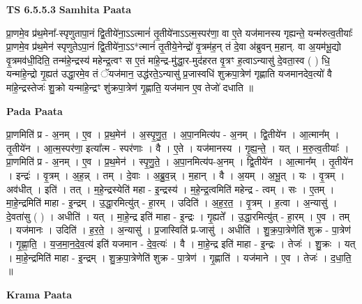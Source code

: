 \documentclass[17pt]{extarticle}
\begin{document}
\textbf{TS 6.5.5.3 } \newline
\textbf{Samhita Paata} \newline

प्रा॒णमे॒व प्र॑थ॒मेना᳚-स्पृणुतापा॒नं द्वि॒तीये॑ना॒ऽऽत्मानं॑ तृ॒तीये॑नाऽऽत्म॒स्पर॑णा॒ वा ए॒ते यज॑मानस्य गृह्यन्ते॒ यन्म॑रुत्व॒तीयाः᳚ प्रा॒णमे॒व प्र॑थ॒मेन॑ स्पृणुतेऽपा॒नं द्वि॒तीये॑ना॒ऽऽ*त्मानं॑ तृ॒तीये॒नेन्द्रो॑ वृ॒त्रम॑ह॒न् तं दे॒वा अ॑ब्रुवन् म॒हान्. वा अ॒यम॑भू॒द्यो वृ॒त्रमव॑धी॒दिति॒ तन्म॑हे॒न्द्रस्य॑ महेन्द्र॒त्वꣳ स ए॒तं मा॑हे॒न्द्र-मु॑द्धा॒र-मुद॑हरत वृ॒त्रꣳ ह॒त्वाऽन्यासु॑ दे॒वता॒स्व ( ) धि॒ यन्मा॑हे॒न्द्रो गृ॒ह्यत॑ उद्धा॒रमे॒व तं ॅयज॑मान॒ उद्ध॑रते॒ऽन्यासु॑ प्र॒जास्वधि॑ शुक्रपा॒त्रेण॑ गृह्णाति यजमानदेव॒त्यो॑ वै मा॑हे॒न्द्रस्तेजः॑ शु॒क्रो यन्मा॑हे॒न्द्रꣳ शु॑क्रपा॒त्रेण॑ गृ॒ह्णाति॒ यज॑मान ए॒व तेजो॑ दधाति ॥ \newline

\textbf{Pada Paata} \newline

प्रा॒णमिति॑ प्र - अ॒नम् । ए॒व । प्र॒थ॒मेन॑ । अ॒स्पृ॒णु॒त॒ । अ॒पा॒नमित्य॑प - अ॒नम् । द्वि॒तीये॑न । आ॒त्मान᳚म् । तृ॒तीये॑न । आ॒त्म॒स्पर॑णा॒ इत्या᳚त्म - स्पर॑णाः । वै । ए॒ते । यज॑मानस्य । गृ॒ह्य॒न्ते॒ । यत् । म॒रु॒त्व॒तीयाः᳚ । प्रा॒णमिति॑ प्र - अ॒नम् । ए॒व । प्र॒थ॒मेन॑ । स्पृ॒णु॒ते॒ । अ॒पा॒नमित्य॑प-अ॒नम् । द्वि॒तीये॑न । आ॒त्मान᳚म् । तृ॒तीये॑न । इन्द्रः॑ । वृ॒त्रम् । अ॒ह॒न्न् । तम् । दे॒वाः । अ॒ब्रु॒व॒न्न् । म॒हान् । वै । अ॒यम् । अ॒भू॒त् । यः । वृ॒त्रम् । अव॑धीत् । इति॑ । तत् । म॒हे॒न्द्रस्येति॑ महा - इ॒न्द्रस्य॑ । म॒हे॒न्द्र॒त्वमिति॑ महेन्द्र - त्वम् । सः । ए॒तम् । मा॒हे॒न्द्रमिति॑ माहा - इ॒न्द्रम् । उ॒द्धा॒रमित्यु॑त् - हा॒रम् । उदिति॑ । अ॒ह॒र॒त॒ । वृ॒त्रम् । ह॒त्वा । अ॒न्यासु॑ । दे॒वता॑सु ( ) । अधीति॑ । यत् । मा॒हे॒न्द्र इति॑ माहा - इ॒न्द्रः । गृ॒ह्यते᳚ । उ॒द्धा॒रमित्यु॑त् - हा॒रम् । ए॒व । तम् । यज॑मानः । उदिति॑ । ह॒र॒ते॒ । अ॒न्यासु॑ । प्र॒जास्विति॑ प्र-जासु॑ । अधीति॑ । शु॒क्र॒पा॒त्रेणेति॑ शुक्र - पा॒त्रेण॑ । गृ॒ह्णा॒ति॒ । य॒ज॒मा॒न॒दे॒व॒त्य॑ इति॑ यजमान - दे॒व॒त्यः॑ । वै । मा॒हे॒न्द्र इति॑ माहा - इ॒न्द्रः । तेजः॑ । शु॒क्रः । यत् । मा॒हे॒न्द्रमिति॑ माहा - इ॒न्द्रम् । शु॒क्र॒पा॒त्रेणेति॑ शुक्र - पा॒त्रेण॑ । गृ॒ह्णाति॑ । यज॑माने । ए॒व । तेजः॑ । द॒धा॒ति॒ ॥  \newline


\textbf{Krama Paata} \newline
\end{document}
